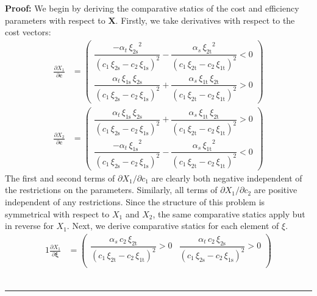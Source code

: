 \documentclass[11pt,a4paper,leqno]{extarticle}
\newenvironment{proof}[1][Proof]{\noindent\textbf{#1:} }{\ \rule{0.5em}{0.5em}}
\begin{document}
	
	\hfill 
	
	\begin{proof}
		We begin by deriving the comparative statics of the cost and efficiency parameters with respect to $\mathbf{X}$.   Firstly, we take derivatives with respect to the cost vectors:
		\begin{align*}
		\frac{\partial X_1}{\partial \mathbf{c}} &= 
		\begin{pmatrix}
		\dfrac{-\alpha _{t}\,{\xi _{\mathrm{2s}}}^2}{{\left(c_{1}\,\xi _{\mathrm{2s}}-c_{2}\,\xi _{\mathrm{1s}}\right)}^2}-\dfrac{\alpha _{s}\,{\xi _{\mathrm{2t}}}^2}{{\left(c_{1}\,\xi _{\mathrm{2t}}-c_{2}\,\xi _{\mathrm{1t}}\right)}^2}<0 \\
		\dfrac{\alpha _{t}\,\xi _{\mathrm{1s}}\,\xi _{\mathrm{2s}}}{{\left(c_{1}\,\xi _{\mathrm{2s}}-c_{2}\,\xi _{\mathrm{1s}}\right)}^2}+\dfrac{\alpha _{s}\,\xi _{\mathrm{1t}}\,\xi _{\mathrm{2t}}}{{\left(c_{1}\,\xi _{\mathrm{2t}}-c_{2}\,\xi _{\mathrm{1t}}\right)}^2}>0
		\end{pmatrix}\\
		\frac{\partial X_2}{\partial \mathbf{c}} &= 
		\begin{pmatrix}
		\dfrac{\alpha _{t}\,\xi _{\mathrm{1s}}\,\xi _{\mathrm{2s}}}{{\left(c_{1}\,\xi _{\mathrm{2s}}-c_{2}\,\xi _{\mathrm{1s}}\right)}^2}+\dfrac{\alpha _{s}\,\xi _{\mathrm{1t}}\,\xi _{\mathrm{2t}}}{{\left(c_{1}\,\xi _{\mathrm{2t}}-c_{2}\,\xi _{\mathrm{1t}}\right)}^2}>0 \\
		\dfrac{-\alpha _{t}\,{\xi _{\mathrm{1s}}}^2}{{\left(c_{1}\,\xi _{\mathrm{2s}}-c_{2}\,\xi _{\mathrm{1s}}\right)}^2}-\dfrac{\alpha _{s}\,{\xi _{\mathrm{1t}}}^2}{{\left(c_{1}\,\xi _{\mathrm{2t}}-c_{2}\,\xi _{\mathrm{1t}}\right)}^2}<0
		\end{pmatrix}
		\end{align*}
		The first and second terms of $\partial X_1 / \partial c_1$ are clearly both negative independent of the restrictions on the parameters. Similarly, all terms of  $\partial X_1 / \partial c_2$ are positive independent of any restrictions. Since the structure of this problem is symmetrical with respect to $X_1$ and $X_2$, the same comparative statics apply but in reverse for $X_1$. Next, we derive comparative statics for each element of $\xi$.
		\begin{alignat*}{1}
		\frac{\partial X_1}{\partial \boldsymbol{\xi}} &= 
		\begin{pmatrix}
		\dfrac{\alpha _{s}\,c_{2}\,\xi _{\mathrm{2t}}}{{\left(c_{1}\,\xi _{\mathrm{2t}}-c_{2}\,\xi _{\mathrm{1t}}\right)}^2}>0 & \dfrac{\alpha _{t}\,c_{2}\,\xi _{\mathrm{2s}}}{{\left(c_{1}\,\xi _{\mathrm{2s}}-c_{2}\,\xi _{\mathrm{1s}}\right)}^2}>0 \\

\end{pmatrix}
\end{alignat*}
\end{proof}
\end{document}

